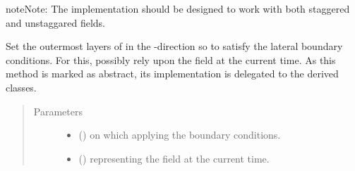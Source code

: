 \documentclass[letterpaper,10pt,english]{sphinxmanual}
\begin{document}
\begin{fulllineitems}
\begin{fulllineitems}
\begin{quote}
\begin{description}
\end{description}\end{quote}

\begin{sphinxadmonition}{note}{Note:}
The implementation should be designed to work with both staggered and unstaggared fields.
\end{sphinxadmonition}

\end{fulllineitems}


\begin{fulllineitems}
\label{\detokenize{api:dycore.horizontal_boundary.HorizontalBoundary.set_outermost_layers_x}}
Set the outermost layers of  in the -direction so to satisfy the lateral
boundary conditions. For this, possibly rely upon the field  at the current time.
As this method is marked as abstract, its implementation is delegated to the derived classes.
\begin{quote}\begin{description}
\item[{Parameters}] \leavevmode\begin{itemize}
\item {} 
 () \textendash{}  on which applying the boundary conditions.

\item {} 
 () \textendash{}  representing the field at the current time.

\end{itemize}

\end{description}\end{quote}

\end{fulllineitems}



\end{fulllineitems}
\end{document}
